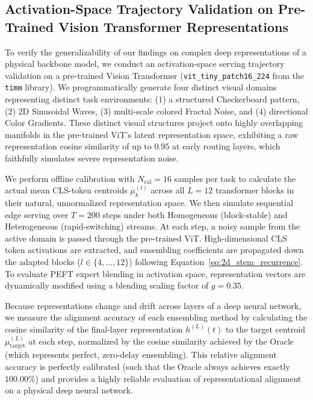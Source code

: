 \subsection{Activation-Space Trajectory Validation on Pre-Trained Vision Transformer Representations}
To verify the generalizability of our findings on complex deep representations of a physical backbone model, we conduct an activation-space serving trajectory validation on a pre-trained Vision Transformer (\texttt{vit\_tiny\_patch16\_224} from the \texttt{timm} library). We programmatically generate four distinct visual domains representing distinct task environments: (1) a structured Checkerboard pattern, (2) 2D Sinusoidal Waves, (3) multi-scale colored Fractal Noise, and (4) directional Color Gradients. These distinct visual structures project onto highly overlapping manifolds in the pre-trained ViT's latent representation space, exhibiting a raw representation cosine similarity of up to $0.95$ at early routing layers, which faithfully simulates severe representation noise.

We perform offline calibration with $N_{\text{cal}} = 16$ samples per task to calculate the actual mean CLS-token centroids $\mu_k^{(l)}$ across all $L = 12$ transformer blocks in their natural, unnormalized representation space. We then simulate sequential edge serving over $T = 200$ steps under both Homogeneous (block-stable) and Heterogeneous (rapid-switching) streams. At each step, a noisy sample from the active domain is passed through the pre-trained ViT. High-dimensional CLS token activations are extracted, and ensembling coefficients are propagated down the adapted blocks ($l \in \{4, \dots, 12\}$) following Equation~\ref{eq:2d_stem_recurrence}. To evaluate PEFT expert blending in activation space, representation vectors are dynamically modified using a blending scaling factor of $g = 0.35$.

Because representations change and drift across layers of a deep neural network, we measure the alignment accuracy of each ensembling method by calculating the cosine similarity of the final-layer representation $h^{(L)}(t)$ to the target centroid $\mu_{\text{target}}^{(L)}$ at each step, normalized by the cosine similarity achieved by the Oracle (which represents perfect, zero-delay ensembling). This relative alignment accuracy is perfectly calibrated (such that the Oracle always achieves exactly $100.00\%$) and provides a highly reliable evaluation of representational alignment on a physical deep neural network.

